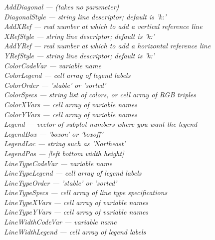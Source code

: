 \documentclass{article}
\newcommand{\namevalue}[2]{{\it #1 --- #2}}
\begin{document}
\namevalue{AddDiagonal}{(takes no parameter)} \\  %
\hspace*{1cm} \namevalue{DiagonalStyle}{string line descriptor; default is 'k:'} \\
\namevalue{AddXRef}{real number at which to add a vertical reference line} \\
\hspace*{1cm} \namevalue{XRefStyle}{string line descriptor; default is 'k:'} \\
\namevalue{AddYRef}{real number at which to add a horizontal reference line} \\
\hspace*{1cm} \namevalue{YRefStyle}{string line descriptor; default is 'k:'} \\
\namevalue{ColorCodeVar}{variable name} \\
\namevalue{ColorLegend}{cell array of legend labels} \\
\namevalue{ColorOrder}{'stable' or 'sorted'} \\
\namevalue{ColorSpecs}{string list of colors, or cell array of RGB triples} \\
\namevalue{ColorXVars}{cell array of variable names} \\
\namevalue{ColorYVars}{cell array of variable names} \\
\namevalue{Legend}{vector of subplot numbers where you want the legend} \\
\namevalue{LegendBox}{'boxon' or 'boxoff'} \\
\namevalue{LegendLoc}{string such as 'Northeast'} \\
\namevalue{LegendPos}{[left bottom width height]} \\
\namevalue{LineTypeCodeVar}{variable name} \\
\namevalue{LineTypeLegend}{cell array of legend labels} \\
\namevalue{LineTypeOrder}{'stable' or 'sorted'} \\
\namevalue{LineTypeSpecs}{cell array of line type specifications} \\
\namevalue{LineTypeXVars}{cell array of variable names} \\
\namevalue{LineTypeYVars}{cell array of variable names} \\
\namevalue{LineWidthCodeVar}{variable name} \\
\namevalue{LineWidthLegend}{cell array of legend labels} \\
\end{document}
